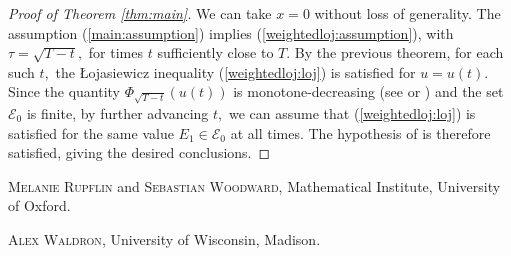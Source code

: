 \documentclass[10pt,reqno]{amsart}
\theoremstyle{plain}
\theoremstyle{definition}
\numberwithin{equation}{section}
\begin{document}
\begin{proof}[Proof of Theorem \ref{thm:main}]
We can take $x = 0$ without loss of generality. The assumption (\ref{main:assumption}) implies (\ref{weightedloj:assumption}), with $\tau = \sqrt{T - t},$ for times $t$ sufficiently close to $T.$ By the previous theorem, for each such $t,$ the \L ojasiewicz inequality (\ref{weightedloj:loj}) is satisfied for $u = u(t).$ Since the quantity $\Phi_{\sqrt{T - t}}(u(t))$ is monotone-decreasing (see \cite{struwehmsurfaces} or \cite[Theorem 3.2]{waldronweighted}) and the set $\mathcal{E}_0$ is finite, by further advancing $t,$ we can assume that (\ref{weightedloj:loj}) is satisfied for the same value $E_1 \in \mathcal{E}_0$ at all times. The hypothesis of \cite[Corollary 4.3]{waldronweighted} is therefore satisfied, giving the desired conclusions.
\end{proof}





\textsc{Melanie Rupflin} and \textsc{Sebastian Woodward}, Mathematical Institute, University of Oxford.

\textsc{Alex Waldron}, University of Wisconsin, Madison.



\end{document}
